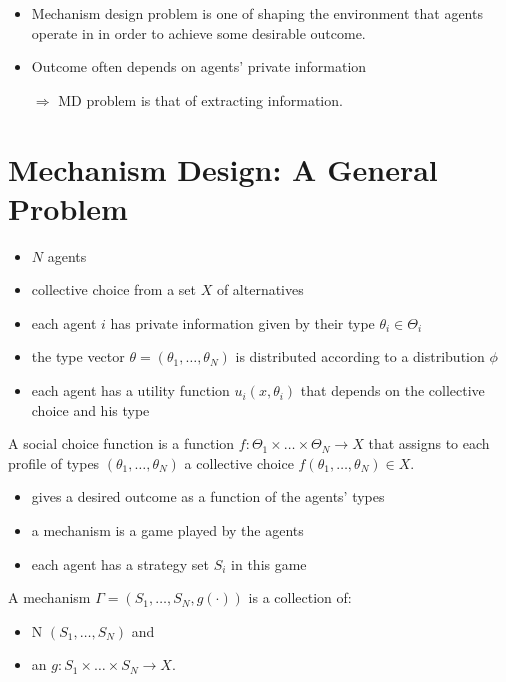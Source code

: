\documentclass[english]{beamer}		%
\def\lyxframeend{} %
\begin{document}
\begin{itemize}
	\item Mechanism design problem is one of shaping the environment that agents operate in in order to achieve some desirable outcome.
	\item Outcome often depends on agents' private information 
	
	$\Rightarrow$ MD problem is that of extracting information.
\end{itemize}
\lyxframeend




\section{Mechanism Design: A General Problem}

\begin{itemize}
	\item $N$ agents
	\item collective choice from a set $X$ of alternatives
	\item each agent $i$ has private information given by their type $\theta_i\in\Theta_{i}$
	\item the type vector $\theta=(\theta_1,\dots,\theta_{N})$ is distributed according to a distribution $\phi$
	\item each agent has a utility function $u_{i}(x,\theta_{i})$ that depends on the collective choice and his type
\end{itemize}
\lyxframeend


\begin{definition}
	A \alert{social choice function} is a function $f:\Theta_{1}\times \dots\times\Theta_{N}\rightarrow X$ that assigns to each profile of types $(\theta_{1},\dots,\theta_{N})$ a collective choice $f(\theta_{1},\dots,\theta_{N})\in X$.
\end{definition}
\begin{itemize}
	\item gives a desired outcome as a function of the agents' types
\end{itemize}
\lyxframeend


\begin{itemize}
	\item a mechanism is a game played by the agents
	\item each agent has a strategy set $S_{i}$ in this game
\end{itemize}
\begin{definition}[mechanism]
	A \alert{mechanism} $\Gamma=(S_{1},\dots,S_{N},g(\cdot))$ is a collection of: 
	\begin{itemize}
		\item N  $(S_{1},\dots,S_{N})$ and 
		\item an  $g:S_{1}\times\dots\times S_{N}\rightarrow X$.
	\end{itemize}
\end{definition}
\lyxframeend
\end{document}

